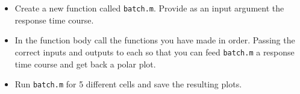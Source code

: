 \documentclass[paper=a4, fontsize=11pt]{scrartcl} %
\numberwithin{equation}{section} %
\numberwithin{figure}{section} %
\numberwithin{table}{section} %
\begin{document}
\begin{itemize}
\setlength{\parskip}{0.25em}
\item Create a new function called \texttt{batch.m}. Provide as an input argument the response time course. 
\item In the function body call the functions you have made in order. Passing the correct inputs and outputs to each so that you can feed \texttt{batch.m} a response time course and get back a polar plot. 
\item Run \texttt{batch.m} for 5 different cells and save the resulting plots. 
\end{itemize}
\end{document}
